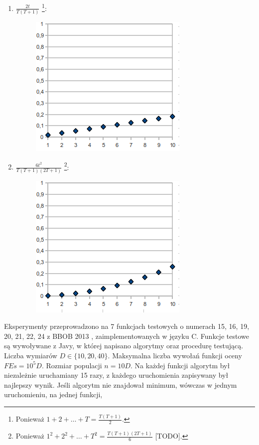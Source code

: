 \documentclass[12pt, a4paper]{article}
\begin{document}
\begin{enumerate}
\begin{figure}[H]
  \end{figure}
 \item $\frac{2t}{T(T+1)}$
\footnote{Ponieważ $1 + 2 + \dots + T = \frac{T(T+1)}{2}$.}:
  \begin{figure}[H]
  \centering
  \includegraphics[scale=0.5]{img/4.png} 
  \end{figure}
 \item $\frac{6t^2}{T(T+1)(2T+1)}$
\footnote{Ponieważ $1^2 + 2^2 + \dots + T^2 = \frac{T(T+1)(2T+1)}{6}$ [TODO].}:
  \begin{figure}[H]
  \centering
  \includegraphics[scale=0.5]{img/5.png} 
  \end{figure}
\end{enumerate}
Eksperymenty przeprowadzono na 7 funkcjach testowych o numerach 15, 16, 19, 20, 21, 22, 24 z BBOB 2013 \cite{finck, hansen}, 
zaimplementowanych w języku C.
Funkcje testowe są wywoływane z Javy, w której napisano algorytmy oraz procedurę testującą.
Liczba wymiarów $D \in \{10, 20, 40\}$. Maksymalna liczba wywołań funkcji oceny $FEs = 10^5D$. 
Rozmiar populacji $n = 10D$. 
Na każdej funkcji algorytm był niezależnie uruchamiany 15 razy, z każdego uruchomienia zapisywany był najlepszy wynik.
Jeśli algorytm nie znajdował minimum, wówczas w jednym uruchomieniu, na jednej funkcji, 
\end{document}
